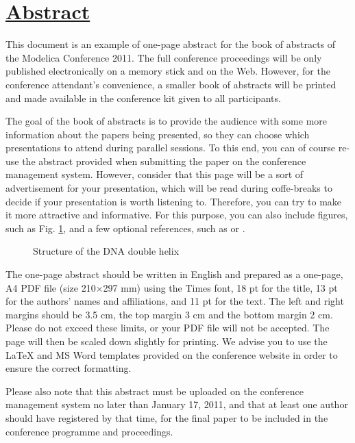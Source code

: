 \pagebreak

\section*{\underline{Abstract}}

This document is an example of one-page abstract for the book of abstracts
of the Modelica Conference 2011. The full conference proceedings will be only published
electronically on a memory stick and on the Web. However, for the conference
attendant's convenience, a smaller book of abstracts will be printed and made available
in the conference kit given to all participants.

The goal of the book of abstracts is to provide the audience with some more information
about the papers being presented, so they can choose which presentations to attend during parallel
sessions. To this end, you can of course re-use the abstract provided when submitting the paper on
the conference management system. However, consider that this page will be a sort of
advertisement for your presentation, which will be read during coffe-breaks to decide
if your presentation is worth listening to. Therefore, you can try to make it more
attractive and informative. For this purpose, you can also
include figures, such as Fig. \ref{fig5}, and a few optional references, such as \cite{dna}
or \cite{Modelica}.
\begin{figure}[h]
\centerline{}
\caption{Structure of the DNA double helix}
\label{fig5}
\par
\end{figure}

The one-page abstract should be written in English and prepared as a one-page, A4 PDF file (size 210$\times$297 mm) using the Times font, 18 pt for the title, 13 pt for the authors' names and affiliations,
and 11 pt for the text. The left and right margins should be 3.5 cm, the top margin 3 cm and the bottom margin
2 cm. Please do not exceed these limits, or your PDF file will not be accepted. The page will then be
scaled down slightly for printing. We advise you to use the {\LaTeX} and MS Word templates provided on the conference website in order to ensure the correct formatting.

Please also note that this abstract must be uploaded on the conference management
system no later than January 17, 2011, and that at least one author should have registered by that time,
for the final paper to be included in the conference programme and proceedings.





